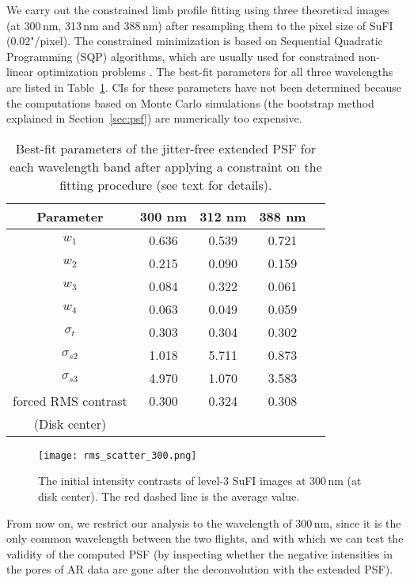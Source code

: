 \documentclass[goettingen, gauss, print]{thesis}
\begin{document}
We carry out the constrained limb profile fitting using three theoretical images (at 300\,nm, 313\,nm and 388\,nm) after resampling them to the pixel size of SuFI (0.02"/pixel). The constrained minimization is based on Sequential Quadratic Programming (SQP) algorithms, which are usually used for constrained non-linear optimization problems \citep{johansen_constrained_2004}. The best-fit parameters for all three wavelengths are listed in Table~\ref{tab:psfpar_cons}. CIs for these parameters have not been determined because the computations based on Monte Carlo simulations (the bootstrap method explained in Section~\ref{sec:psf}) are numerically too expensive.


\begin{table}[h]
\caption{Best-fit parameters of the jitter-free extended PSF for each wavelength band after applying a constraint on the fitting procedure (see text for details).}
\label{tab:psfpar_cons}
\centering
\begin{tabular}{ccccc}

\hline
\hline
Parameter  & 300 nm & 312 nm & 388 nm \\
\hline
\hline
 $w_1$ &  0.636  & 0.539&0.721 \\
 $w_2$&  0.215 &0.090&0.159\\
 $w_3$&  0.084 &0.322&0.061\\
 $w_4$&   0.063 &0.049&0.059\\
 $\sigma_t$& 0.303&0.304&0.302\\
$\sigma_{s2}$& 1.018&5.711&0.873\\
$\sigma_{s3}$&  4.970&1.070&3.583\\
\hline
forced RMS contrast & 0.300 & 0.324 & 0.308 \\
(Disk center) \\
\hline
\end{tabular}
\end{table}



\begin{figure}
\centering
\texttt{[image: rms\_scatter\_300.png]}
\caption{The initial intensity contrasts of level-3 SuFI images at 300\,nm (at disk center). The red dashed line is the average value. }
\label{rms_scatter_300}
\end{figure}



From now on, we restrict our analysis to the wavelength of 300\,nm, since it is the only common wavelength between the two flights, and with which we can test the validity of the computed PSF (by inspecting whether the negative intensities in the pores of AR data are gone after the deconvolution with the extended PSF). 
\end{document}
